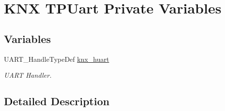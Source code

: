 \hypertarget{group___k_n_x___p_h___t_p_u_a_r_t___private___variables}{}\section{K\+NX T\+P\+Uart Private Variables}
\label{group___k_n_x___p_h___t_p_u_a_r_t___private___variables}
\subsection*{Variables}
\begin{DoxyCompactItemize}
\item 
U\+A\+R\+T\+\_\+\+Handle\+Type\+Def \hyperlink{group___k_n_x___p_h___t_p_u_a_r_t___private___variables_ga9308eecc1a4f261fab20bd754fd5d5fc}{knx\+\_\+huart}\hypertarget{group___k_n_x___p_h___t_p_u_a_r_t___private___variables_ga9308eecc1a4f261fab20bd754fd5d5fc}{}\label{group___k_n_x___p_h___t_p_u_a_r_t___private___variables_ga9308eecc1a4f261fab20bd754fd5d5fc}

\begin{DoxyCompactList}\small\item\em U\+A\+RT Handler. \end{DoxyCompactList}\end{DoxyCompactItemize}


\subsection{Detailed Description}
